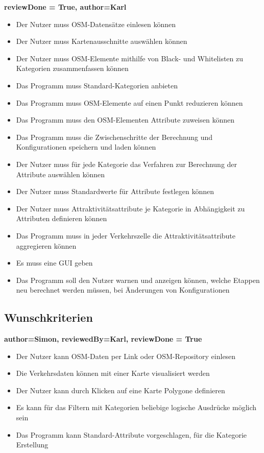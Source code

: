 \documentclass[parskip=full]{scrartcl} %
\begin{document}
\textbf{reviewDone = True, author=Karl\\}
\begin{itemize}
    \item Der Nutzer muss OSM-Datensätze einlesen können
    \item Der Nutzer muss Kartenausschnitte auswählen können
    \item Der Nutzer muss OSM-Elemente mithilfe von Black- und Whitelisten zu Kategorien zusammenfassen können
    \item Das Programm muss Standard-Kategorien anbieten
    \item Das Programm muss OSM-Elemente auf einen Punkt reduzieren können
    \item Das Programm muss den OSM-Elementen Attribute zuweisen können
    \item Das Programm muss die Zwischenschritte der Berechnung und Konfigurationen speichern und laden können
    \item Der Nutzer muss für jede Kategorie das Verfahren zur Berechnung der Attribute auswählen können
    \item Der Nutzer muss Standardwerte für Attribute festlegen können
    \item Der Nutzer muss Attraktivitätsattribute je Kategorie in Abhängigkeit zu Attributen definieren können
    \item Das Programm muss in jeder Verkehrszelle die Attraktivitätsattribute aggregieren können
    \item Es muss eine GUI geben
    \item Das Programm soll den Nutzer warnen und anzeigen können, welche Etappen neu berechnet werden müssen, bei Änderungen von Konfigurationen
\end{itemize}


\subsection{Wunschkriterien}
\textbf{author=Simon, reviewedBy=Karl, reviewDone = True\\}
\begin{itemize}
    \item Der Nutzer kann OSM-Daten per Link oder OSM-Repository einlesen
    \item Die Verkehrsdaten können mit einer Karte visualisiert werden
    \item Der Nutzer kann durch Klicken auf eine Karte Polygone definieren
    \item Es kann für das Filtern mit Kategorien beliebige logische Ausdrücke möglich sein
    \item Das Programm kann Standard-Attribute vorgeschlagen, für die Kategorie Erstellung
\end{itemize}
\end{document}

